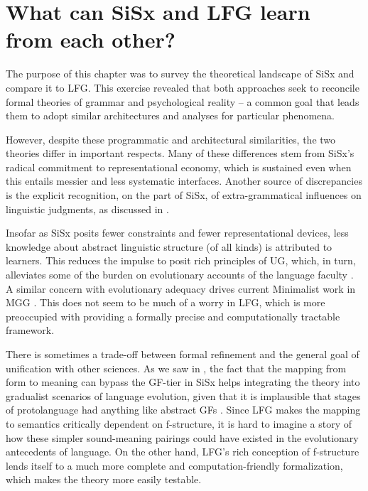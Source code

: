 \documentclass[output=paper,hidelinks]{langscibook}
\begin{document}
\section{What can SiSx and LFG learn from each other?}\label{ss:sec6}

The purpose of this chapter was to survey the theoretical landscape of SiSx and compare it to LFG. This exercise revealed that both approaches seek to reconcile formal theories of grammar and psychological reality -- a common goal that leads them to adopt similar architectures and analyses for particular phenomena.  

However, despite these programmatic and architectural similarities, the two theories differ in important respects. Many of these differences stem from SiSx's radical commitment to representational economy, which is sustained even when this entails messier and less systematic interfaces. Another source of discrepancies is the explicit recognition, on the part of SiSx, of extra-grammatical influences on linguistic judgments, as discussed in .

Insofar as SiSx posits fewer constraints and fewer representational devices, less knowledge about abstract linguistic structure (of all kinds) is attributed to learners. This reduces the impulse to posit rich principles of UG, which, in turn, alleviates some of the burden on evolutionary accounts of the language faculty \citep{jackendoff1999possible, jackendoff2002foundations, jackendoff2005nature}. A similar concern with evolutionary adequacy drives current Minimalist work in MGG \citep{hornstein2009theory, berwick2015why}. This does not seem to be much of a worry in LFG, which is more preoccupied with providing a formally precise and computationally tractable framework. 

There is sometimes a trade-off between formal refinement and the
general goal of unification with other sciences. As we saw in , the fact that the mapping from form to meaning can bypass the GF-tier in SiSx helps integrating the theory into gradualist scenarios of language evolution, given that it is implausible that stages of protolanguage had anything like abstract GFs \citep{jackendoff1999possible, jackendoff2002foundations, progovac2016gradualist}. Since LFG makes the mapping to semantics critically dependent on f-structure, it is hard to imagine a story of how these simpler sound-meaning pairings could have existed in the evolutionary antecedents of language.  On the other hand, LFG's rich conception of f-structure lends itself to a much more complete and computation-friendly formalization, which makes the theory more easily testable.  
\end{document}
